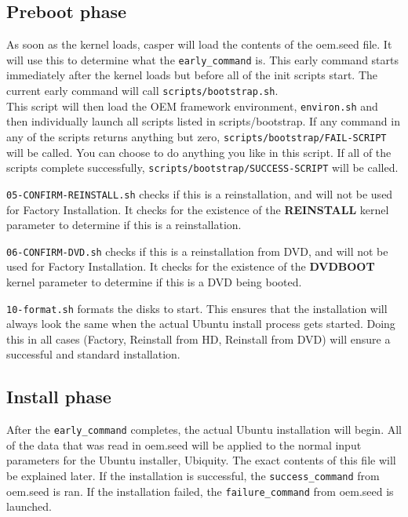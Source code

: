 \documentclass[letterpaper,10pt,titlepage]{article}
\begin{document}
\subsection{Preboot phase}
As soon as the kernel loads, casper will load the contents of the oem.seed file.  It will use this to determine what the \texttt{early_command} is.  This early command starts immediately after the kernel loads but before all of the init scripts start.  The current early command will call \texttt{scripts/bootstrap.sh}.
\\
This script will then load the OEM framework environment, \texttt{environ.sh} and then individually launch all scripts listed in scripts/bootstrap.  If any command in any of the scripts returns anything but zero, \texttt{scripts/bootstrap/FAIL-SCRIPT} will be called.  You can choose to do anything you like in this script.  If all of the scripts complete successfully, \texttt{scripts/bootstrap/SUCCESS-SCRIPT} will be called.
\\
\begin{list}{}
\item \texttt{05-CONFIRM-REINSTALL.sh} checks if this is a reinstallation, and will not be used for Factory Installation.  It checks for the existence of the \textbf{REINSTALL} kernel parameter to determine if this is a reinstallation.
\\
\item \texttt{06-CONFIRM-DVD.sh} checks if this is a reinstallation from DVD, and will not be used for Factory Installation.  It checks for the existence of the \textbf{DVDBOOT} kernel parameter to determine if this is a DVD being booted.

\item \texttt{10-format.sh} formats the disks to start.  This ensures that the installation will always look the same when the actual Ubuntu install process gets started.  Doing this in all cases (Factory, Reinstall from HD, Reinstall from DVD) will ensure a successful and standard installation.
\end{list}

\subsection{Install phase}
After the \texttt{early_command} completes, the actual Ubuntu installation will begin.  All of the data that was read in oem.seed will be applied to the normal input parameters for the Ubuntu installer, Ubiquity.  The exact contents of this file will be explained later.
If the installation is successful, the \texttt{success_command} from oem.seed is ran.  If the installation failed, the \texttt{failure_command} from oem.seed is launched.
\end{document}
